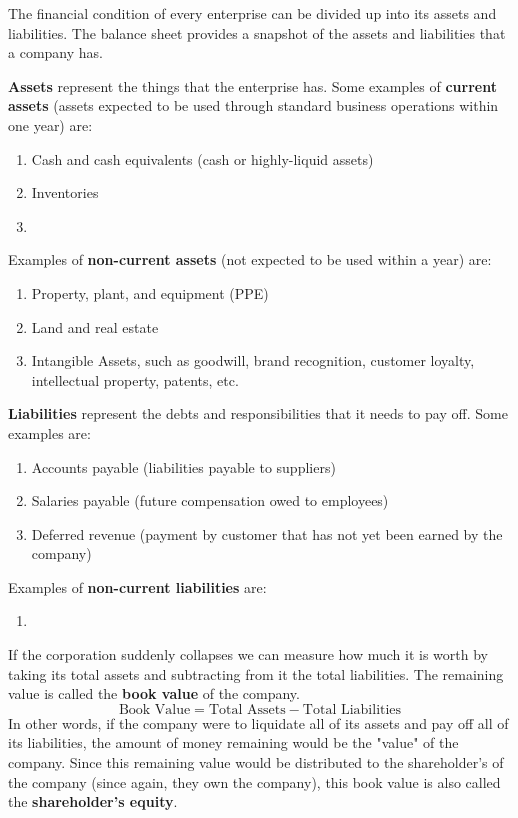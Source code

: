 \documentclass{article}
\begin{document}
    The financial condition of every enterprise can be divided up into its assets and liabilities. The balance sheet provides a snapshot of the assets and liabilities that a company has. 

    \begin{definition}[Assets]
      \textbf{Assets} represent the things that the enterprise has. Some examples of \textbf{current assets} (assets expected to be used through standard business operations within one year) are: 
      \begin{enumerate}
        \item Cash and cash equivalents (cash or highly-liquid assets)
        \item Inventories
        \item
      \end{enumerate}
      Examples of \textbf{non-current assets} (not expected to be used within a year) are: 
      \begin{enumerate}
        \item Property, plant, and equipment (PPE)
        \item Land and real estate
        \item Intangible Assets, such as goodwill, brand recognition, customer loyalty, intellectual property, patents, etc. 
      \end{enumerate}
    \end{definition}

    \begin{definition}[Liabilities]
      \textbf{Liabilities} represent the debts and responsibilities that it needs to pay off. Some examples are: 
      \begin{enumerate}
        \item Accounts payable (liabilities payable to suppliers) 
        \item Salaries payable (future compensation owed to employees)
        \item Deferred revenue (payment by customer that has not yet been earned by the company) 
      \end{enumerate}
      Examples of \textbf{non-current liabilities} are: 
      \begin{enumerate}
          \item 
      \end{enumerate}
    \end{definition}

    \begin{definition}
      If the corporation suddenly collapses we can measure how much it is worth by taking its total assets and subtracting from it the total liabilities. The remaining value is called the \textbf{book value} of the company. 
      \[\text{Book Value} = \text{Total Assets} - \text{Total Liabilities}\]
      In other words, if the company were to liquidate all of its assets and pay off all of its liabilities, the amount of money remaining would be the "value" of the company. Since this remaining value would be distributed to the shareholder's of the company (since again, they own the company), this book value is also called the \textbf{shareholder's equity}. 
    \end{definition}
\end{document}
